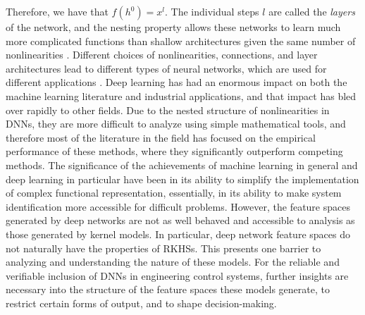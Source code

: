 Therefore, we have that $f(h^0) = x^l$. 
The individual steps $l$ are called the \emph{layers} of the network, and the nesting property allows these networks to learn much more complicated functions than shallow architectures given the same number of nonlinearities 
\cite{bengio2009learning}. Different choices of nonlinearities, connections, and layer architectures lead to different types of neural networks, which are used for different applications \cite{goodfellow2016deep}. Deep learning has had an enormous impact on both the machine learning literature and industrial applications, and that impact has bled over rapidly to other fields. Due to the nested structure of nonlinearities in DNNs, they are more difficult to analyze using simple mathematical tools, and therefore most of the literature in the field has focused on the empirical performance of these methods, where they significantly outperform competing methods.  The significance of the achievements of machine learning in general and deep learning in particular have been in its ability to simplify the implementation of complex functional representation, essentially, in its ability to make system identification more accessible for difficult problems. However, the feature spaces generated by deep networks are not as well behaved and accessible to analysis as those generated by kernel models. In particular, deep network feature spaces do not naturally have the properties of RKHSs.  This presents one barrier to analyzing and understanding the nature of these models. For the reliable and verifiable inclusion of DNNs in engineering control systems, %
further insights are necessary into the structure of the feature spaces
these models generate, to restrict certain forms of output, and to shape decision-making. 